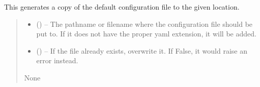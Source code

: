 \documentclass[letterpaper,11pt,english]{sphinxmanual}
\begin{document}
\begin{savenotes}\begin{fulllineitems}
\label{\detokenize{code/opihiexarata.library.config:opihiexarata.library.config.generate_configuration_file_copy}}
\pysigstartsignatures
{}
\pysigstopsignatures
\sphinxAtStartPar
This generates a copy of the default configuration file to the given
location.
\begin{quote}\begin{description}
\begin{itemize}
\item {} 
\sphinxAtStartPar
{} () – The pathname or filename where the configuration file should be put
to. If it does not have the proper yaml extension, it will be added.

\item {} 
\sphinxAtStartPar
{} (\sphinxstyleliteralemphasis{\sphinxupquote{, }}) – If the file already exists, overwrite it. If False, it would raise
an error instead.

\end{itemize}

\sphinxAtStartPar
None

\end{description}\end{quote}

\end{fulllineitems}\end{savenotes}

\end{document}
